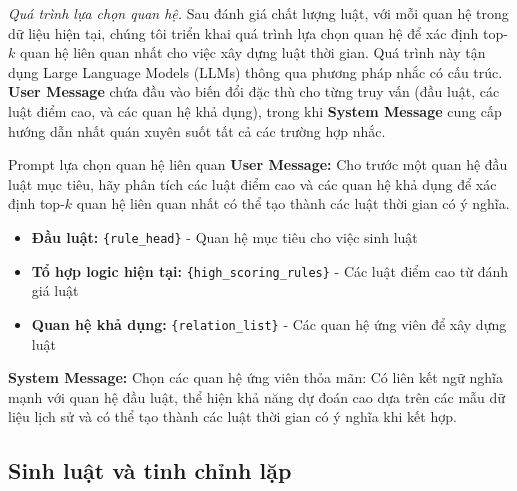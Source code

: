 \textit{Quá trình lựa chọn quan hệ.} Sau đánh giá chất lượng luật, với mỗi quan hệ trong dữ liệu hiện tại, chúng tôi triển khai quá trình lựa chọn quan hệ để xác định top-$k$ quan hệ liên quan nhất cho việc xây dựng luật thời gian. Quá trình này tận dụng Large Language Models (LLMs) thông qua phương pháp nhắc có cấu trúc. \textbf{User Message} chứa đầu vào biến đổi đặc thù cho từng truy vấn (đầu luật, các luật điểm cao, và các quan hệ khả dụng), trong khi \textbf{System Message} cung cấp hướng dẫn nhất quán xuyên suốt tất cả các trường hợp nhắc.


\begin{promptbox}{Prompt lựa chọn quan hệ liên quan}
\textbf{User Message:}
Cho trước một quan hệ đầu luật mục tiêu, hãy phân tích các luật điểm cao và các quan hệ khả dụng để xác định top-$k$ quan hệ liên quan nhất có thể tạo thành các luật thời gian có ý nghĩa.
\begin{itemize}
    \item \textbf{Đầu luật:} \texttt{\{rule\_head\}} - Quan hệ mục tiêu cho việc sinh luật
    \item \textbf{Tổ hợp logic hiện tại:} \texttt{\{high\_scoring\_rules\}} - Các luật điểm cao từ đánh giá luật
    \item \textbf{Quan hệ khả dụng:} \texttt{\{relation\_list\}} - Các quan hệ ứng viên để xây dựng luật
\end{itemize}

\textbf{System Message:} Chọn các quan hệ ứng viên thỏa mãn: Có liên kết ngữ nghĩa mạnh với quan hệ đầu luật, thể hiện khả năng dự đoán cao dựa trên các mẫu dữ liệu lịch sử và có thể tạo thành các luật thời gian có ý nghĩa khi kết hợp.
\end{promptbox}

\subsection{Sinh luật và tinh chỉnh lặp}

